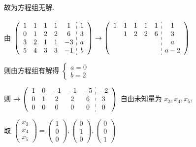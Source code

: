 		 故为方程组无解.


	 \paragraph{} %
		 由 \( \left(\begin{array}{ccccc:c}
				 1 & 1 & 1 & 1 & 1  & 1 \\
				 0 & 1 & 2 & 2 & 6  & 3 \\
				 3 & 2 & 1 & 1 & -3 & a \\
				 5 & 4 & 3 & 3 & -1 & b
			 \end{array}\right)
		 \to
		 \left(\begin{array}{ccccc:c}
				 1 & 1 & 1 & 1 & 1 & 1   \\
				   & 1 & 2 & 2 & 6 & 3   \\
				   &   &   &   &   & a   \\
				   &   &   &   &   & a-2
			 \end{array}\right) \)

		 则由方程组有解得
		 \( \begin{cases}
			 a = 0 \\
			 b = 2
		 \end{cases} \)

		 则 \( \rightarrow \left(\begin{array}{ccccc:c}
				 1 & 0 & -1 & -1 & -5 & -2 \\
				 0 & 1 & 2  & 2  & 6  & 3  \\
				 0 & 0 & 0  & 0  & 0  & 0
			 \end{array}\right) \) 自由未知量为 \( x_{3}, x_{4}, x_{5} \),

		 取
		 \( \begin{pmatrix}
			 x_{3} \\
			 x_{4} \\
			 x_{5}
		 \end{pmatrix} = \begin{pmatrix}
			 1 \\
			 0 \\
			 0
		 \end{pmatrix}, \begin{pmatrix}
			 0 \\
			 1 \\
			 0
		 \end{pmatrix}, \begin{pmatrix}
			 0 \\
			 0 \\
			 1
		 \end{pmatrix}\)

